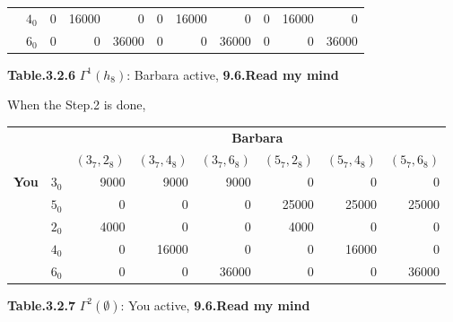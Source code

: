\documentclass{article}
\begin{document}
\begin{description}
\begin{center}
\begin{tabular}{rrrrrrrrrrr}
        \multicolumn{ 1}{c}{{\bf }} &        $4_0$ &          0 &      16000 &          0 &          0 &      16000 &          0 &          0 &      16000 &          0 \\

        \multicolumn{ 1}{c}{{\bf }} &        $6_0$ &          0 &          0 &      36000 &          0 &          0 &      36000 &          0 &          0 &      36000 \\
        \hline
        \hline
        \end{tabular}

        {\bf Table.3.2.6 }$\Gamma ^1(h_8)$: Barbara active, {\bf 9.6.Read my mind}
    \end{center}
    \newpage
    When the Step.2 is done,
    \begin{center}
        \begin{tabular}{rrrrrrrr}
        \hline
        \hline
                   &            &                                          \multicolumn{ 6}{c}{{\bf Barbara}} \\

                   &            &  $(3_7,2_8)$ &  $(3_7,4_8)$ &  $(3_7,6_8)$ &  $(5_7,2_8)$ &  $(5_7,4_8)$ &  $(5_7,6_8)$ \\
        \hline
        \multicolumn{ 1}{c}{{\bf You}} &        $3_0$ &       9000 &       9000 &       9000 &          0 &          0 &          0 \\

        \multicolumn{ 1}{c}{{\bf }} &        $5_0$ &          0 &          0 &          0 &      25000 &      25000 &      25000 \\

        \multicolumn{ 1}{c}{{\bf }} &        $2_0$ &       4000 &          0 &          0 &       4000 &          0 &          0 \\

        \multicolumn{ 1}{c}{{\bf }} &        $4_0$ &          0 &      16000 &          0 &          0 &      16000 &          0 \\

        \multicolumn{ 1}{c}{{\bf }} &        $6_0$ &          0 &          0 &      36000 &          0 &          0 &      36000 \\
        \hline
        \hline
        \end{tabular}

        {\bf Table.3.2.7 }$\Gamma ^2(\emptyset )$: You active, {\bf 9.6.Read my mind}
    \end{center}


\end{description}
\end{document}
